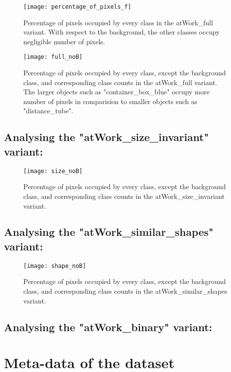 \documentclass[paper=a4,11pt,parskip=half,toc=listof]{scrartcl}
\begin{document}
			\begin{figure}[!htb]
				\centering
				\texttt{[image: percentage\_of\_pixels\_f]}
				\caption{Percentage of pixels occupied by every class in the atWork\_full variant. With respect to the background, the other classes occupy negligible number of pixels.}
				\label{Fig:ana_full_b}
			\end{figure}
			
			\begin{figure}[!htb]
			\centering
				\texttt{[image: full\_noB]}
				\caption{Percentage of pixels occupied by every class, except the background class, and corresponding class counts in the atWork\_full variant. The larger objects such as "container\_box\_blue" occupy more number of pixels in comparision to smaller objects such as "distance\_tube".}
				\label{Fig:ana_full}
			\end{figure}
		
	\subsection{Analysing the "atWork\_size\_invariant" variant:}
		
		\begin{figure}[!htb]
		\centering
			\texttt{[image: size\_noB]}
			\caption{Percentage of pixels occupied by every class, except the background class, and corresponding class counts in the atWork\_size\_invariant variant.}
			\label{Fig:ana_size}
		\end{figure}
		
	\subsection{Analysing the "atWork\_similar\_shapes" variant:}
		
		\begin{figure}[!htb]
		\centering
			\texttt{[image: shape\_noB]}
			\caption{Percentage of pixels occupied by every class, except the background class, and corresponding class counts in the atWork\_similar\_shapes variant.}
			\label{Fig:ana_shape}
		\end{figure}
		
	\subsection{Analysing the "atWork\_binary" variant:}
	

\newpage
\section{Meta-data of the dataset}
\end{document}
